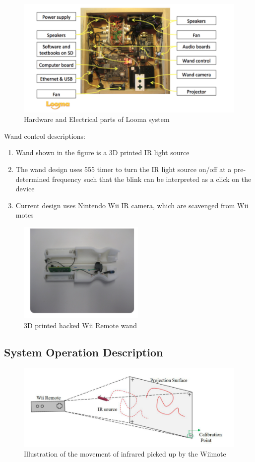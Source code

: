 \documentclass[12pt, a4paper]{article}
\begin{document}
\begin{figure}[htp]
\centering
\includegraphics[scale=0.22]{looma}
\caption{Hardware and Electrical parts of Looma system}
\label{}
\end{figure}

\newpage

Wand control descriptions:
\begin{enumerate}
\item Wand shown in the figure is a 3D printed IR light source
\item The wand design uses 555 timer to turn the IR light source on/off at a pre-determined frequency such that the blink can be interpreted as a click on the device
\item Current design uses Nintendo Wii IR camera, which are scavenged from Wii motes
\end{enumerate}

\begin{figure}[htp]
\centering
\includegraphics[width=2.4in]{wand1}
\caption{3D printed hacked Wii Remote wand}
\label{}
\end{figure}

\subsection{System Operation Description}
\begin{figure}[htp]
\centering
\includegraphics[scale=0.35]{wiiiii.png}
\caption{Illustration of the movement of infrared picked up by the Wiimote}
\label{}
\end{figure}
\end{document}
